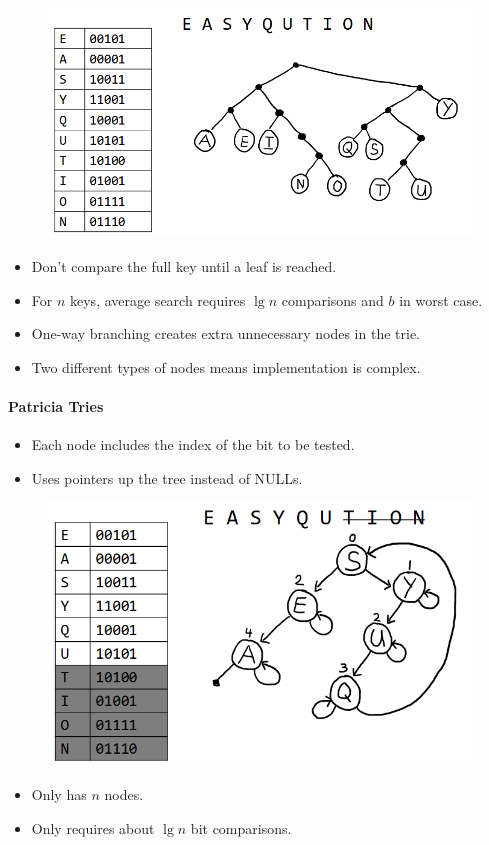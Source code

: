 \documentclass[twocolumn,english]{article}
\numberwithin{equation}{section}
\numberwithin{figure}{section}
\numberwithin{table}{section}
\begin{document}
\begin{figure}[H]
\centering{}\includegraphics[width=0.75\linewidth]{img/bst}
\end{figure}
\begin{itemize}
\item Don't compare the full key until a leaf is reached.
\item For $n$ keys, average search requires $\lg n$ comparisons and $b$
in worst case.
\item One-way branching creates extra unnecessary nodes in the trie.
\item Two different types of nodes means implementation is complex.
\end{itemize}

\paragraph{Patricia Tries}
\begin{itemize}
\item Each node includes the index of the bit to be tested.
\item Uses pointers up the tree instead of NULLs.
\end{itemize}
\begin{figure}[H]
\centering{}\includegraphics[width=0.5\linewidth]{img/pt}
\end{figure}
\begin{itemize}
\item Only has $n$ nodes.
\item Only requires about $\lg n$ bit comparisons.
\end{itemize}
\end{document}
